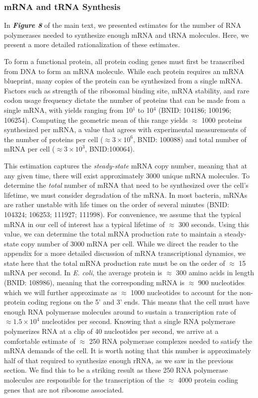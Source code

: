 \subsubsection{mRNA and tRNA Synthesis}
In \textbf{\textit{Figure 8}} of the main text, we presented
estimates for the number of RNA polymerases needed to synthesize enough mRNA
and tRNA molecules. Here, we present a more detailed rationalization of these estimates.

To form a functional protein, all protein coding genes must first be
transcribed from DNA to form an mRNA molecule. While each protein requires an
mRNA blueprint, many copies of the protein can be synthesized from a single
mRNA. Factors such as strength of the ribosomal binding site, mRNA stability,
and rare codon usage frequency dictate the number of proteins that can be
made from a single mRNA, with yields ranging from 10$^1$ to 10$^4$ (BNID:
104186; 100196; 106254). Computing the geometric mean of this range yields
$\approx$ 1000 proteins synthesized per mRNA, a value that agrees with
experimental measurements of the number of proteins per cell ($\approx 3
\times 10^6$, BNID: 100088) and total number of mRNA per cell ($\approx 3
\times 10^3$, BNID:100064).

This estimation captures the \textit{steady-state} mRNA copy number, meaning
that at any given time, there will exist approximately 3000 unique mRNA
molecules. To determine the \textit{total} number of mRNA that need to be
synthesized over the cell's lifetime, we must consider degradation of the
mRNA. In most bacteria, mRNAs are rather unstable with life times on the
order of several minutes (BNID: 104324; 106253; 111927; 111998). For
convenience, we assume that the typical mRNA in our cell of interest has a
typical lifetime of $\approx$ 300 seconds. Using this value, we can determine
the total mRNA production rate to maintain a steady-state copy number of 3000
mRNA per cell. While we direct the reader to the appendix for a more detailed
discussion of mRNA transcriptional dynamics, we state here that the total
mRNA production rate must be on the order of $\approx$ 15 mRNA per second. In
\textit{E. coli}, the average protein is $\approx$ 300 amino acids in length
(BNID: 108986), meaning that the corresponding mRNA is $\approx$ 900
nucleotides which we will further approximate as $\approx$ 1000 nucleotides
to account for the non-protein coding regions on the 5' and 3' ends. This
means that the cell must have enough RNA polymerase molecules around to
sustain a transcription rate of $\approx 1.5 \times 10^4$ nucleotides per
second. Knowing that a single RNA polymerase polymerizes RNA at a clip of 40
nucleotides per second, we arrive at a comfortable estimate of $\approx$ 250
RNA polymerase complexes needed to satisfy the mRNA demands of the cell. It
is worth noting that this number is approximately half of that required to
synthesize enough rRNA, as we saw in the previous section. We find this to be
a striking result as these 250 RNA polymerase molecules are responsible for
the transcription of the $\approx$ 4000 protein coding genes that are not
ribosome associated.

